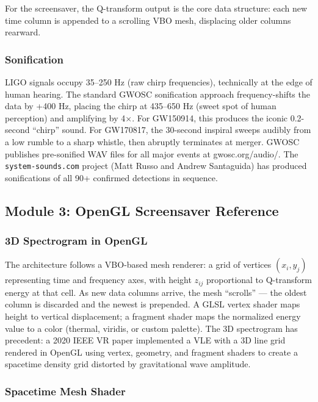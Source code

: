 \documentclass[11pt,letterpaper]{article}
\begin{document}
For the screensaver, the Q-transform output is the core data structure: each new time column is appended to a scrolling VBO mesh, displacing older columns rearward.

\subsubsection{Sonification}

LIGO signals occupy 35--250 Hz (raw chirp frequencies), technically at the edge of human hearing. The standard GWOSC sonification approach frequency-shifts the data by +400 Hz, placing the chirp at 435--650 Hz (sweet spot of human perception) and amplifying by 4$\times$. For GW150914, this produces the iconic 0.2-second ``chirp'' sound. For GW170817, the 30-second inspiral sweeps audibly from a low rumble to a sharp whistle, then abruptly terminates at merger. GWOSC publishes pre-sonified WAV files for all major events at gwosc.org/audio/. The \texttt{system-sounds.com} project (Matt Russo and Andrew Santaguida) has produced sonifications of all 90+ confirmed detections in sequence.

\subsection{Module 3: OpenGL Screensaver Reference}

\subsubsection{3D Spectrogram in OpenGL}

The architecture follows a VBO-based mesh renderer: a grid of vertices $(x_i, y_j)$ representing time and frequency axes, with height $z_{ij}$ proportional to Q-transform energy at that cell. As new data columns arrive, the mesh ``scrolls'' --- the oldest column is discarded and the newest is prepended. A GLSL vertex shader maps height to vertical displacement; a fragment shader maps the normalized energy value to a color (thermal, viridis, or custom palette). The 3D spectrogram has precedent: a 2020 IEEE VR paper implemented a VLE with a 3D line grid rendered in OpenGL using vertex, geometry, and fragment shaders to create a spacetime density grid distorted by gravitational wave amplitude.

\subsubsection{Spacetime Mesh Shader}
\end{document}
